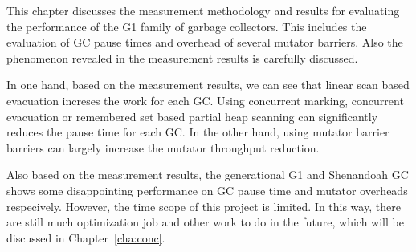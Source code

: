 This chapter discusses the measurement methodology and results for evaluating the
performance of the G1 family of garbage collectors. This includes the evaluation of
GC pause times and overhead of several mutator barriers. Also the phenomenon revealed
in the measurement results is carefully discussed.

In one hand, based on the measurement results, we can see that linear scan based evacuation
increses the work for each GC. Using concurrent marking, concurrent evacuation
or remembered set based partial heap scanning can significantly reduces the pause time
for each GC. In the other hand, using mutator barrier barriers can largely increase the
mutator throughput reduction.

Also based on the measurement results, the generational G1 and Shenandoah GC shows some
disappointing performance on GC pause time and mutator overheads respecively.
However, the time scope of this project is limited.
In this way, there are still much optimization job and other work to do in the future,
which will be discussed in Chapter~\ref{cha:conc}.







%   

%       

%       

